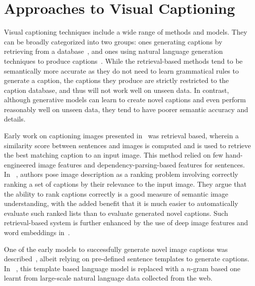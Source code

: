 \section{Approaches to Visual Captioning}
Visual captioning techniques include a wide range of methods and models.
They can be broadly categorized into two groups: ones generating captions by
retrieving from a database~\cite{Farhadi2010, Hodosh2013,Karpathy2014},
and ones using natural language generation techniques to produce
captions~\cite{Li2011,kulkarni2013babytalk,Vinyals_2015_CVPR,Fang2015}.
While the retrieval-based methods tend to be semantically more accurate as they
do not need to learn grammatical rules to generate a caption, the captions they
produce are strictly restricted to the caption database, and thus will not work
well on unseen data.
In contrast, although generative models can learn to create novel captions and
even perform reasonably well on unseen data, they tend to have poorer semantic
accuracy and details.

Early work on captioning images presented in~\cite{Farhadi2010} was retrieval
based, wherein a similarity score between sentences and images is computed and
is used to retrieve the best matching caption to an input image. 
This method relied on few hand-engineered image features and
dependency-parsing-based features for sentences.
In ~\cite{Hodosh2013}, authors pose image description as a ranking problem
involving correctly ranking a set of captions by their relevance to the input
image.
They argue that the ability to rank captions correctly is a good measure of
semantic image understanding, with the added benefit that it is much easier to
automatically evaluate such ranked lists than to evaluate generated novel
captions.
Such retrieval-based system is further enhanced by the use of deep image
features and word embeddings in~\cite{Karpathy2014}.

One of the early models to successfully generate novel image captions was
described~\cite{kulkarni2013babytalk}, albeit relying on pre-defined sentence
templates to generate captions.
In ~\cite{Li2011}, this template based language model is replaced with a
$n$-gram based one learnt from large-scale natural language data collected from
the web.

